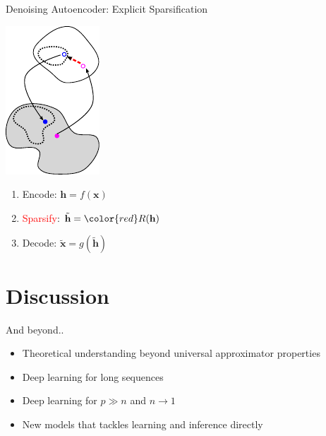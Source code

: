 \documentclass{beamer}
\newcommand{\vect}[1]{\mathbf{#1}}
\newcommand{\vh}[0]{\vect{h}}
\newcommand{\vx}[0]{\vect{x}}
\newcommand{\tred}[1]{\textcolor{red}{#1}}
\begin{document}
\begin{frame}{Denoising Autoencoder: Explicit Sparsification}
\begin{minipage}[t!]{0.44\textwidth}
    \centering
    \includegraphics[width=0.55\columnwidth,angle=330,origin=c]{./sparsification.pdf}

    \begin{enumerate}
    \itemsep 0em
    \item Encode: $\vh = f(\vx)$
    \item \tred{Sparsify}: $\tilde{\vh} = \color{red}R(\vh)$
    \item Decode: $\tilde{\vx} = g(\tilde{\vh})$
    \end{enumerate}
    \vfill

\end{minipage}

\end{frame}


\section{Discussion}

\begin{frame}{And beyond..}
\begin{itemize}
\item Theoretical understanding beyond universal approximator properties
\item Deep learning for long sequences
\item Deep learning for $p \gg n$ and $n \to 1$
\item New models that tackles learning and inference directly
\end{itemize}
\end{frame}
\end{document}
